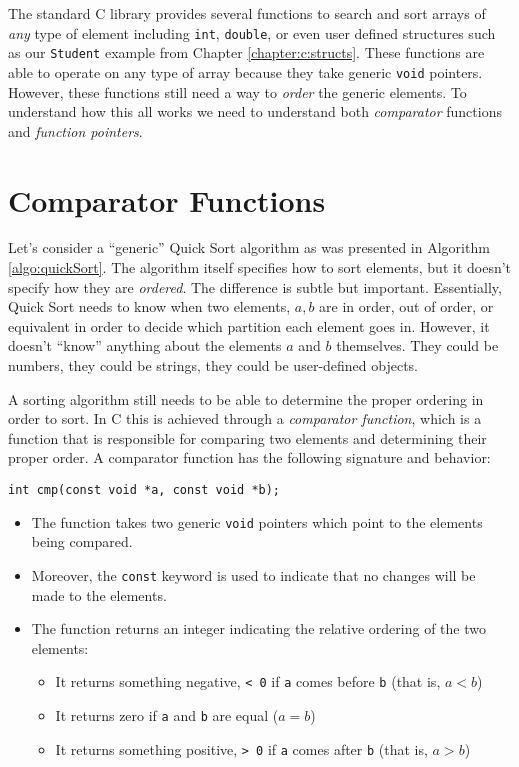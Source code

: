 

The standard C library provides several functions to search and sort
arrays of \emph{any} type of element including \texttt{int}, 
\texttt{double}, or even user defined structures such as our
\texttt{Student} example from Chapter \ref{chapter:c:structs}.  
These functions are able to operate on any type of array because they
take generic \texttt{void} pointers.  However, these functions
still need a way to \emph{order} the generic elements.  To understand
how this all works we need to understand both \emph{comparator} functions
and \emph{function pointers}.

\section{Comparator Functions}

Let's consider a ``generic'' Quick Sort algorithm as was presented in
Algorithm \ref{algo:quickSort}.  The algorithm itself specifies how to 
sort elements, but
it doesn't specify how they are \emph{ordered}.  The difference is subtle
but important.  Essentially, Quick Sort needs to know when two elements, 
$a, b$ are in order, out of order, or equivalent in order to decide which
partition each element goes in.  However, it doesn't ``know'' anything about
the elements $a$ and $b$ themselves.  They could be numbers, they could
be strings, they could be user-defined objects.  

A sorting algorithm still needs to be able to determine the proper ordering 
in order to sort.  In C this is achieved through a \emph{comparator function}, 
which is a function that is responsible for comparing two elements and
determining their proper order.  A comparator function has the following 
signature and behavior:

\texttt{int cmp(const void *a, const void *b);}

\begin{itemize}
  \item The function takes two generic \texttt{void} pointers which
  	point to the elements being compared.  
  \item Moreover, the \texttt{const} keyword is used to indicate that
  	no changes will be made to the elements.
  \item The function returns an integer indicating the relative ordering of
  	the two elements:
	\begin{itemize}
	  \item It returns something negative, \texttt{< 0} if \texttt{a}
	  comes before \texttt{b} (that is, $a < b$)
	  \item It returns zero if \texttt{a} and \texttt{b} are
	  equal ($a = b$)
	  \item It returns something positive, \texttt{> 0} if \texttt{a}
	  comes after \texttt{b} (that is, $a > b$)
	\end{itemize}
\end{itemize}

